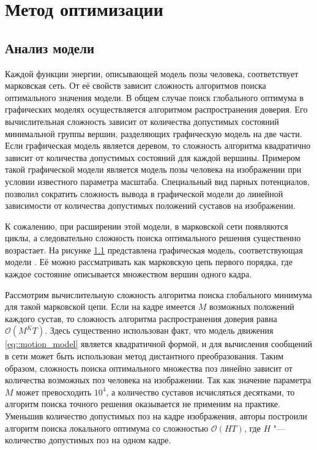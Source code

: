 \section{Метод оптимизации}

\subsection{Анализ модели}

Каждой функции энергии, описывающей модель позы человека, соответствует марковская сеть. От её свойств зависит сложность алгоритмов поиска оптимального значения модели. В общем случае поиск глобального оптимума в графических моделях осуществляется алгоритмом распространения доверия. Его вычислительная сложность зависит от количества допустимых состояний минимальной группы вершин, разделяющих графическую модель на две части. Если графическая модель является деревом, то сложность алгоритма квадратично зависит от количества допустимых состояний для каждой вершины. Примером такой графической модели является модель позы человека на изображении при условии известного параметра масштаба. Специальный вид парных потенциалов, позволил сократить сложность вывода в графической модели до линейной зависимости от количества допустимых положений суставов на изображении.

К сожалению, при расширении этой модели, в марковской сети появляются циклы, а следовательно сложность поиска оптимального решения существенно возрастает. На рисунке \ref{} представлена графическая модель, соответствующая модели \cite{park2011n}. Её можно рассматривать как марковскую цепь первого порядка, где каждое состояние описывается множеством вершин одного кадра.

Рассмотрим вычислительную сложность алгоритма поиска глобального минимума для такой марковской цепи. Если на кадре имеется $M$ возможных положений каждого сустав, то сложность алгоритма распространения доверия равна $\mathcal{O}(M^{K}T)$. Здесь существенно использован факт, что модель движения \eqref{eq::motion_model} является квадратичной формой, и для вычисления сообщений в сети может быть использован метод дистантного преобразования. Таким образом, сложность поиска оптимального множества поз линейно зависит от количества возможных поз человека на изображении. Так как значение параметра $M$ может превосходить $10^4$, а количество суставов исчисляться десятками, то алгоритм поиска точного решения оказывается не применим на практике. Уменьшив количество допустимых поз на кадре изображения, авторы \cite{park2011n} построили алгоритм поиска локального оптимума со сложностью $\mathcal{O}(HT)$, где $H$ "--- количество допустимых поз на одном кадре.

